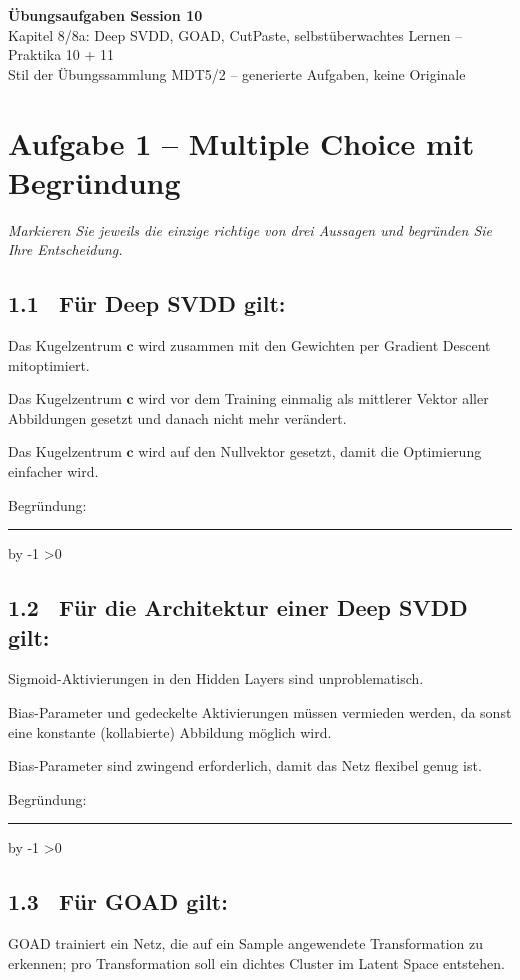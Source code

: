 \documentclass[10pt,a4paper]{article}
\newcommand{\mcbox}{\raisebox{-1pt}{\fbox{\rule{0pt}{7pt}\rule{7pt}{0pt}}}\hspace{6pt}}
\newcommand{\antwortlinien}[1]{%
  \par\vspace{2pt}%
  \newcount\zeilen \zeilen=#1
  \loop
    \noindent\rule{\linewidth}{0.4pt}\par\vspace{11pt}%
    \advance\zeilen by -1
  \ifnum\zeilen>0 \repeat
}
\begin{document}
\begin{center}
  {\Large\bfseries Übungsaufgaben Session 10}\\[4pt]
  {\large Kapitel 8/8a: Deep SVDD, GOAD, CutPaste, selbstüberwachtes Lernen -- Praktika 10 + 11}\\[4pt]
  \small Stil der Übungssammlung MDT5/2 -- generierte Aufgaben, keine Originale
\end{center}

\vspace{4pt}

\section*{Aufgabe 1 -- Multiple Choice mit Begründung}
\emph{Markieren Sie jeweils die einzige richtige von drei Aussagen und begründen Sie Ihre Entscheidung.}

\subsection*{1.1 \ Für Deep SVDD gilt:}
\mcbox Das Kugelzentrum $\boldsymbol{c}$ wird zusammen mit den Gewichten per Gradient
Descent mitoptimiert.

\mcbox Das Kugelzentrum $\boldsymbol{c}$ wird vor dem Training einmalig als mittlerer
Vektor aller Abbildungen gesetzt und danach nicht mehr verändert.

\mcbox Das Kugelzentrum $\boldsymbol{c}$ wird auf den Nullvektor gesetzt, damit die
Optimierung einfacher wird.

Begründung:
\antwortlinien{2}

\subsection*{1.2 \ Für die Architektur einer Deep SVDD gilt:}
\mcbox Sigmoid-Aktivierungen in den Hidden Layers sind unproblematisch.

\mcbox Bias-Parameter und \glqq gedeckelte\grqq{} Aktivierungen müssen vermieden werden,
da sonst eine konstante (kollabierte) Abbildung möglich wird.

\mcbox Bias-Parameter sind zwingend erforderlich, damit das Netz flexibel genug ist.

Begründung:
\antwortlinien{2}

\subsection*{1.3 \ Für GOAD gilt:}
\mcbox GOAD trainiert ein Netz, die auf ein Sample angewendete Transformation zu erkennen;
pro Transformation soll ein dichtes Cluster im Latent Space entstehen.
\end{document}
